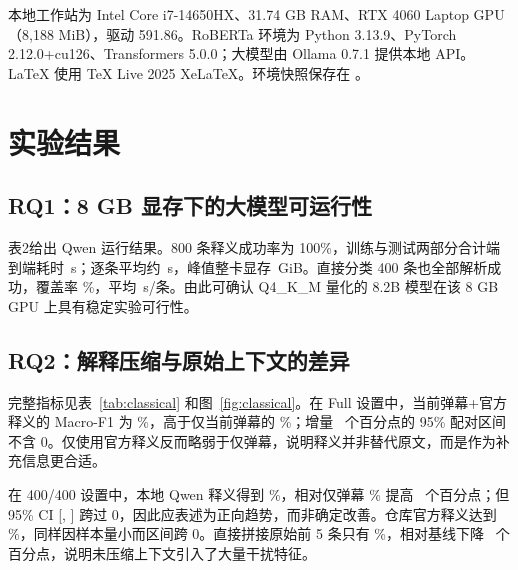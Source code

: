 \documentclass[UTF8,zihao=-4,a4paper]{ctexart}
\begin{document}
本地工作站为 Intel Core i7-14650HX、31.74 GB RAM、RTX 4060 Laptop GPU（8,188 MiB），驱动 591.86。RoBERTa 环境为 Python 3.13.9、PyTorch 2.12.0+cu126、Transformers 5.0.0；大模型由 Ollama 0.7.1 提供本地 API。LaTeX 使用 TeX Live 2025 XeLaTeX。环境快照保存在 。

\section{实验结果}

\subsection{RQ1：8 GB 显存下的大模型可运行性}

表2给出 Qwen 运行结果。800 条释义成功率为 100\%，训练与测试两部分合计端到端耗时 \QwenGenerationWallSeconds\,s；逐条平均约 \QwenGenerationMeanSeconds\,s，峰值整卡显存 \QwenGenerationPeakGiB\,GiB。直接分类 400 条也全部解析成功，覆盖率 \QwenDirectCoverage\%，平均 \QwenDirectMeanSeconds\,s/条。由此可确认 Q4\_K\_M 量化的 8.2B 模型在该 8 GB GPU 上具有稳定实验可行性。

\begin{table}[htbp]
\centering
\caption{Qwen3-8B 本地推理效率。峰值显存为 NVML 整卡用量。}
\label{tab:efficiency}

\end{table}

\subsection{RQ2：解释压缩与原始上下文的差异}

完整指标见表~\ref{tab:classical} 和图~\ref{fig:classical}。在 Full 设置中，当前弹幕+官方释义的 Macro-F1 为 \FullOfficialMacroF\%，高于仅当前弹幕的 \FullContentMacroF\%；增量 \FullOfficialDeltaPP\ 个百分点的 95\% 配对区间不含 0。仅使用官方释义反而略弱于仅弹幕，说明释义并非替代原文，而是作为补充信息更合适。

在 400/400 设置中，本地 Qwen 释义得到 \SmallQwenMacroF\%，相对仅弹幕 \SmallContentMacroF\% 提高 \SmallQwenDeltaPP\ 个百分点；但 95\% CI [\SmallQwenDeltaLowPP, \SmallQwenDeltaHighPP] 跨过 0，因此应表述为正向趋势，而非确定改善。仓库官方释义达到 \SmallOfficialMacroF\%，同样因样本量小而区间跨 0。直接拼接原始前 5 条只有 \SmallRawMacroF\%，相对基线下降 \SmallRawDeltaPP\ 个百分点，说明未压缩上下文引入了大量干扰特征。

\begin{table}[htbp]
\centering
\caption{字符 TF--IDF + Logistic Regression 的主要结果（\%）。P/R/F1 均为 Macro 口径。}
\label{tab:classical}

\end{table}
\end{document}
